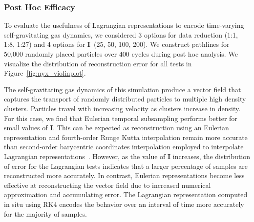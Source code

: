 \subsubsection{Post Hoc Efficacy}
To evaluate the usefulness of Lagrangian representations to encode time-varying self-gravitating gas dynamics, we considered 3 options for data reduction (1:1, 1:8, 1:27) and 4 options for \textbf{I}~(25, 50, 100, 200).
%
We construct pathlines for 50,000 randomly placed particles over 400 cycles during post hoc analysis.
%
%
%
We visualize the distribution of reconstruction error for all tests in Figure~\ref{fig:nyx_violinplot}.
%

The self-gravitating gas dynamics of this simulation produce a vector field that captures the transport of randomly distributed particles to multiple high density clusters.
%
Particles travel with increasing velocity as clusters increase in density.
%
For this case, we find that Eulerian temporal subsampling performs better for small values of \textbf{I}.
%
This can be expected as reconstruction using an Eulerian representation and fourth-order Runge Kutta interpolation remain more accurate than second-order barycentric coordinates interpolation employed to interpolate Lagrangian representations~\cite{bujack2015lagrangian}\cite{hummel2016error}.
%
%
However, as the value of \textbf{I} increases, the distribution of error for the Lagrangian tests indicates that a larger percentage of samples are reconstructed more accurately.
%
In contrast, Eulerian representations become less effective at reconstructing the vector field due to increased numerical approximation and accumulating error.
%
The Lagrangian representation computed in situ using RK4 encodes the behavior over an interval of time more accurately for the majority of samples.
%
%
%

